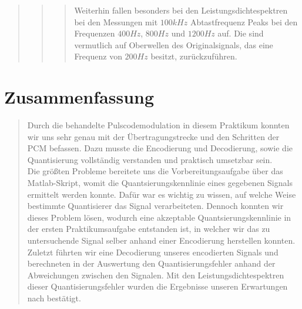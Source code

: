\begin{quote}
\begin{quote}
\begin{quote}
		Weiterhin fallen besonders bei den Leistungsdichtespektren bei den Messungen mit $100 kHz$ Abtastfrequenz Peaks bei
		den Frequenzen $400 Hz$, $800 Hz$ und $1200 Hz$ auf. Die sind vermutlich auf Oberwellen des Originalsignals, das eine
		Frequenz von $200 Hz$ besitzt, zurückzuführen.
			
		\end{quote} %
    \end{quote}  %
         	
\end{quote}%

    
\section{Zusammenfassung}
\begin{quote}

    Durch die behandelte Pulscodemodulation in diesem Praktikum konnten wir uns
    sehr genau mit der Übertragungstrecke und den Schritten der PCM befassen.
    Dazu musste die Encodierung und Decodierung, sowie die Quantisierung
    vollständig verstanden und praktisch umsetzbar sein.\\
    
    Die größten Probleme bereitete uns die Vorbereitungsaufgabe über das
    Matlab-Skript, womit die Quantsierungskennlinie eines gegebenen Signals
    ermittelt werden konnte. Dafür war es wichtig zu wissen, auf welche Weise
    bestimmte Quantisierer das Signal verarbeiteten. Dennoch konnten wir dieses
    Problem lösen, wodurch eine akzeptable Quantsierungskennlinie in der ersten
    Praktikumsaufgabe entstanden ist, in welcher wir das zu untersuchende Signal
    selber anhand einer Encodierung herstellen konnten.\\
     
    Zuletzt führten wir eine Decodierung unseres encodierten Signals und
    berechneten in der Auswertung den Quantisierungsfehler anhand der
    Abweichungen zwischen den Signalen. Mit den Leistungsdichtespektren dieser
    Quantisierungsfehler wurden die Ergebnisse unseren Erwartungen nach
    bestätigt.
    
\end{quote}%
         

